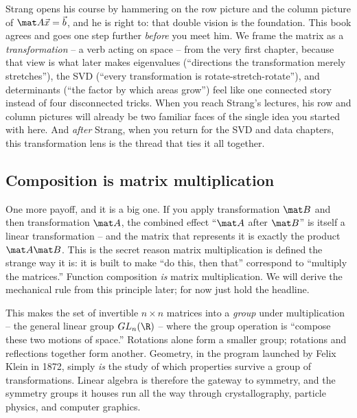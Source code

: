 \begin{strangbox}
Strang opens his course by hammering on the row picture and the column picture of $\mat A\vec x=\vec b$,
and he is right to: that double vision is the foundation. This book agrees and goes one step further
\emph{before} you meet him. We frame the matrix as a \emph{transformation} -- a verb acting on space --
from the very first chapter, because that view is what later makes eigenvalues (``directions the
transformation merely stretches''), the SVD (``every transformation is rotate-stretch-rotate''), and
determinants (``the factor by which areas grow'') feel like one connected story instead of four
disconnected tricks. When you reach Strang's lectures, his row and column pictures will already be two
familiar faces of the single idea you started with here. And \emph{after} Strang, when you return for
the SVD and data chapters, this transformation lens is the thread that ties it all together.
\end{strangbox}

\subsection{Composition is matrix multiplication}

One more payoff, and it is a big one. If you apply transformation $\mat B$ and then transformation
$\mat A$, the combined effect ``$\mat A$ after $\mat B$'' is itself a linear transformation -- and the
matrix that represents it is exactly the product $\mat A\mat B$. This is the secret reason matrix
multiplication is defined the strange way it is: it is built to make ``do this, then that'' correspond
to ``multiply the matrices.'' Function composition \emph{is} matrix multiplication. We will derive the
mechanical rule from this principle later; for now just hold the headline.

\begin{connectionbox}
This makes the set of invertible $n\times n$ matrices into a \emph{group} under multiplication -- the
general linear group $GL_n(\R)$ -- where the group operation is ``compose these two motions of space.''
Rotations alone form a smaller group; rotations and reflections together form another. Geometry, in the
program launched by Felix Klein in 1872, simply \emph{is} the study of which properties survive a group
of transformations. Linear algebra is therefore the gateway to symmetry, and the symmetry groups it
houses run all the way through crystallography, particle physics, and computer graphics.
\end{connectionbox}

